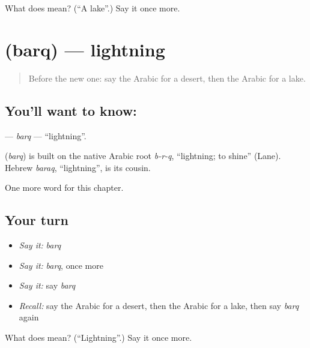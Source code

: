 \begin{tcolorbox}[breakable,colback=teal!4,colframe=teal!35!black,title={Before you move on}]
What does  mean? (\textquotedblleft{}A lake\textquotedblright{}.) Say it once more.
\end{tcolorbox}
\section[\texorpdfstring{\ar{برق} (barq)}{برق (barq)}]{ (barq) — lightning}

\label{lesson:AR-C133-barq}



\begin{quote}
Before the new one: say the Arabic for a desert, then the Arabic for a lake.
\end{quote}

\subsection*{You'll want to know: }
\textbf{} — \emph{barq} — \textquotedblleft{}lightning\textquotedblright{}.

\begin{cousinweb}
\textbf{} (\emph{barq}) is built on the native Arabic root \emph{b-r-q}, \textquotedblleft{}lightning; to shine\textquotedblright{} (Lane). Hebrew \emph{baraq}, \textquotedblleft{}lightning\textquotedblright{}, is its cousin.
\end{cousinweb}

\begin{grammarlens}[title={What you've built}]
One more word for this chapter.
\end{grammarlens}

\subsection*{Your turn}
\begin{itemize}
\raggedright
  \item \emph{Say it:} \emph{barq}
  \item \emph{Say it:} \emph{barq}, once more
  \item \emph{Say it:} say \emph{barq}
  \item \emph{Recall:} say the Arabic for a desert, then the Arabic for a lake, then say \emph{barq} again
\end{itemize}

\begin{tcolorbox}[breakable,colback=teal!4,colframe=teal!35!black,title={Before you move on}]
What does  mean? (\textquotedblleft{}Lightning\textquotedblright{}.) Say it once more.
\end{tcolorbox}
